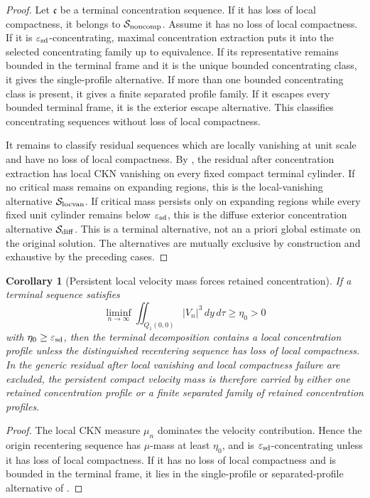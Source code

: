 \documentclass[11pt]{amsart}
\numberwithin{equation}{section}
\theoremstyle{plain}
\newtheorem{corollary}[theorem]{Corollary}
\theoremstyle{definition}
\theoremstyle{remark}
\newcommand{\eps}{\varepsilon}
\begin{document}
\begin{proof}
Let \(\mathfrak c\) be a terminal concentration sequence.  If it has loss of
local compactness, it belongs to \(\mathcal S_{\rm noncomp}\).  Assume it has no
loss of local compactness.  If it is \(\eps_{\rm sd}\)-concentrating, maximal
concentration extraction puts it into the selected concentrating family up to
equivalence.
If its representative remains bounded in the terminal frame and it is the
unique bounded concentrating class, it gives the single-profile alternative.  If
more than one bounded concentrating class is present, it gives a finite separated
profile family.  If it escapes every bounded terminal frame, it is the exterior
escape alternative.  This classifies concentrating sequences without loss of
local compactness.

It remains to classify residual sequences which are locally vanishing at unit
scale and have no loss of local compactness.  By
, the residual after concentration extraction
has local CKN vanishing on every fixed compact terminal cylinder.  If no
critical mass remains on expanding regions, this is the local-vanishing
alternative \(\mathcal S_{\rm locvan}\).  If critical mass persists only on
expanding regions while every fixed unit cylinder remains below
\(\eps_{\rm sd}\), this is the diffuse exterior concentration alternative
\(\mathcal S_{\rm diff}\).  This is a terminal alternative, not an a priori
global estimate on the original solution.  The alternatives are mutually
exclusive by construction and exhaustive by the preceding cases.
\end{proof}

\begin{corollary}[Persistent local velocity mass forces retained concentration]
\label{cor:persistent-forces-active}
If a terminal sequence satisfies
\[
   \liminf_{n\to\infty}
   \iint_{Q_1(0,0)} |V_n|^3\,dy\,d\tau\ge\eta_0>0
\]
with \(\eta_0\ge\eps_{\rm sd}\), then the terminal decomposition contains a
local concentration profile unless the distinguished recentering sequence has
loss of local compactness.  In the generic residual after local vanishing and
local compactness failure are excluded, the persistent compact velocity mass is
therefore carried by either one retained concentration profile or a finite
separated family of retained concentration profiles.
\end{corollary}

\begin{proof}
The local CKN measure \(\mu_n\) dominates the velocity contribution.  Hence the
origin recentering sequence has \(\mu\)-mass at least \(\eta_0\), and is
\(\eps_{\rm sd}\)-concentrating unless it has loss of local compactness.  If it
has no loss of local compactness and is bounded in the terminal frame, it lies
in the single-profile or separated-profile alternative of
.
\end{proof}
\end{document}
